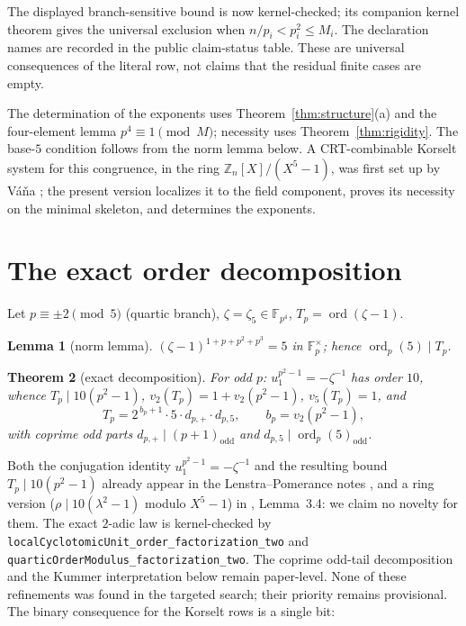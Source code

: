 \documentclass[11pt]{amsart}
\newtheorem{theorem}{Theorem}[section]
\newtheorem{lemma}[theorem]{Lemma}
\theoremstyle{definition}
\theoremstyle{remark}
\newcommand{\F}{\mathbb{F}}
\newcommand{\Z}{\mathbb{Z}}
\newcommand{\ord}{\operatorname{ord}}
\begin{document}
The displayed branch-sensitive bound is now kernel-checked; its companion
kernel theorem gives the universal exclusion when
$n/p_i<p_i^2\le M_i$.  The declaration names are recorded in the public
claim-status table.  These are universal consequences of the literal row,
not claims that the residual finite cases are empty.

The determination of the exponents uses Theorem~\ref{thm:structure}(a) and
the four-element lemma $p^4 \equiv 1 \pmod{M}$; necessity uses
Theorem~\ref{thm:rigidity}. The base-$5$ condition follows from the norm
lemma below. A CRT-combinable Korselt system for this congruence, in the
ring $\Z_n[X]/(X^5-1)$, was first set up by V\'a\v na \cite{Vana2009}; the
present version localizes it to the field component, proves its necessity
on the minimal skeleton, and determines the exponents.

\section{The exact order decomposition}\label{sec:order}

Let $p \equiv \pm2 \pmod 5$ (quartic branch), $\zeta = \zeta_5 \in
\F_{p^4}$, $T_p = \ord(\zeta - 1)$.

\begin{lemma}[norm lemma]\label{lem:norm}
$(\zeta-1)^{1+p+p^2+p^3} = 5$ in $\F_p^\times$; hence
$\ord_p(5) \mid T_p$.
\end{lemma}

\begin{theorem}[exact decomposition]\label{thm:decomposition}
For odd $p$: $u_1^{p^2-1} = -\zeta^{-1}$ has order $10$, whence
$T_p \mid 10(p^2-1)$, $v_2(T_p) = 1 + v_2(p^2-1)$, $v_5(T_p) = 1$, and
\[
T_p = 2^{\,b_p + 1} \cdot 5 \cdot d_{p,+} \cdot d_{p,5},
\qquad b_p = v_2(p^2 - 1),
\]
with coprime odd parts $d_{p,+} \mid (p+1)_{\mathrm{odd}}$ and
$d_{p,5} \mid \ord_p(5)_{\mathrm{odd}}$.
\end{theorem}

Both the conjugation identity $u_1^{p^2-1} = -\zeta^{-1}$ and the resulting
bound $T_p \mid 10(p^2-1)$ already appear in the Lenstra--Pomerance notes
\cite{LP}, and a ring version ($\rho \mid 10(\lambda^2-1)$ modulo $X^5-1$)
in \cite{Vana2009}, Lemma~3.4: we claim no novelty for them. The exact
$2$-adic law is kernel-checked by
\texttt{localCyclotomicUnit\_\allowbreak order\_\allowbreak factorization\_\allowbreak two}
and
\texttt{quarticOrderModulus\_\allowbreak factorization\_\allowbreak two}.
The coprime odd-tail
decomposition and the Kummer interpretation below remain paper-level.
None of these refinements was found in the targeted search; their priority
remains provisional. The binary consequence for the Korselt rows is a
single bit:
\end{document}
